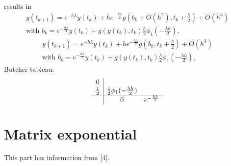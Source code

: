 \documentclass[letterpaper,10pt,english]{jupyterBook}
\begin{document}
\sphinxAtStartPar
results in
\begin{equation*}
\begin{split}
y(t_{k+1}) = e^{-h\lambda}y(t_k) + h e^{- \frac{h\lambda}{2}} g\left(b_k + O(h^2), t_k + \frac{h}{2}\right) + O(h^3) \\
    \text{with } b_k =e^{-\frac{h \lambda}{2}}y(t_k) + g(y(t_k), t_k) \frac{h}{2} \phi_1\left( -\frac{\lambda h}{2} \right),
\end{split}
\end{equation*}\begin{equation*}
\begin{split}
y(t_{k+1}) = e^{-h\lambda}y(t_k) + h e^{- \frac{h\lambda}{2}} g\left(b_k , t_k + \frac{h}{2}\right) + O(h^3) \\
    \text{with } b_k =e^{-\frac{h \lambda}{2}}y(t_k) + g(y(t_k), t_k) \frac{h}{2} \phi_1\left( -\frac{\lambda h}{2} \right),
\end{split}
\end{equation*}
\sphinxAtStartPar
Butcher tableau:
\begin{equation*}
\begin{split}
\begin{array}
{c|cc}
0\\
\frac{1}{2} &  \frac{1}{2} \phi_1( -\frac{\lambda h}{2})\\
\hline
& 0 & e^{-\frac{h \lambda}{2}}
\end{array}
\end{split}
\end{equation*}

\section{Matrix exponential}
\label{\detokenize{appendix:matrix-exponential}}
\sphinxAtStartPar
This part has information from {[}4{]}.
\end{document}
